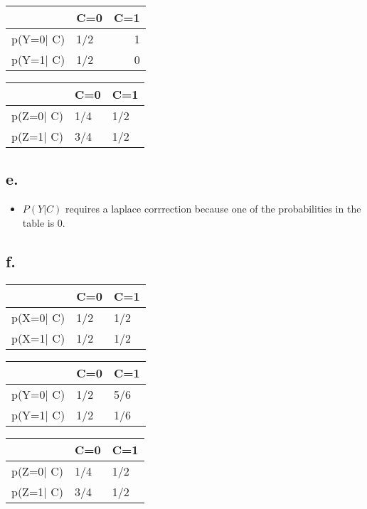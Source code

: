 \documentclass[11pt]{article}
\begin{document}
\begin{center}
\begin{tabular}{l|lr}
 & C=0 & C=1\\
\hline
p(Y=0\(\vert{}\) C) & 1/2 & 1\\
p(Y=1\(\vert{}\) C) & 1/2 & 0\\
\end{tabular}
\end{center}


\begin{center}
\begin{tabular}{l|ll}
 & C=0 & C=1\\
\hline
p(Z=0\(\vert{}\) C) & 1/4 & 1/2\\
p(Z=1\(\vert{}\) C) & 3/4 & 1/2\\
\end{tabular}
\end{center}
\subsection*{e.}
\label{sec:org6fdb19e}
\begin{itemize}
\item \(P(Y|C)\) requires a laplace corrrection because one of the probabilities in
the table is 0.
\end{itemize}
\subsection*{f.}
\label{sec:orge0096b2}

\begin{center}
\begin{tabular}{l|ll}
 & C=0 & C=1\\
\hline
p(X=0\(\vert{}\) C) & 1/2 & 1/2\\
p(X=1\(\vert{}\) C) & 1/2 & 1/2\\
\end{tabular}
\end{center}


\begin{center}
\begin{tabular}{l|ll}
 & C=0 & C=1\\
\hline
p(Y=0\(\vert{}\) C) & 1/2 & 5/6\\
p(Y=1\(\vert{}\) C) & 1/2 & 1/6\\
\end{tabular}
\end{center}


\begin{center}
\begin{tabular}{l|ll}
 & C=0 & C=1\\
\hline
p(Z=0\(\vert{}\) C) & 1/4 & 1/2\\
p(Z=1\(\vert{}\) C) & 3/4 & 1/2\\
\end{tabular}
\end{center}
\end{document}
